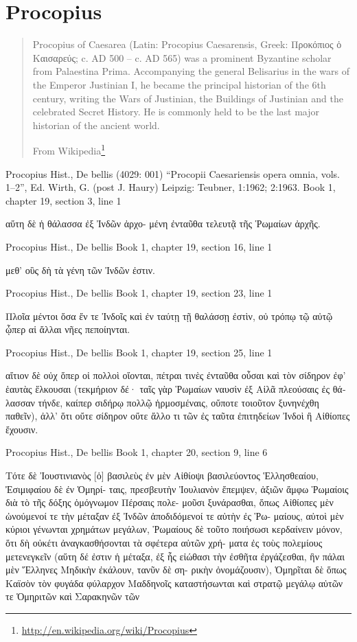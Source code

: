 \documentclass[12pt,letterpaper,twoside,final]{memoir}
\begin{document}
\section{Procopius}
\blockquote[From Wikipedia\footnote{\url{http://en.wikipedia.org/wiki/Procopius}}]{Procopius of Caesarea (Latin: Procopius Caesarensis, Greek: Προκόπιος ὁ Καισαρεύς; c. AD 500 – c. AD 565) was a prominent Byzantine scholar from Palaestina Prima. Accompanying the general Belisarius in the wars of the Emperor Justinian I, he became the principal historian of the 6th century, writing the Wars of Justinian, the Buildings of Justinian and the celebrated Secret History. He is commonly held to be the last major historian of the ancient world.}
\begin{greek}
Procopius Hist., De bellis (4029: 001)
“Procopii Caesariensis opera omnia, vols. 1–2”, Ed. Wirth, G. (post J. Haury)
Leipzig: Teubner, 1:1962; 2:1963.
Book 1, chapter 19, section 3, line 1

                   αὕτη δὲ ἡ θάλασσα ἐξ Ἰνδῶν ἀρχο-
μένη ἐνταῦθα τελευτᾷ τῆς Ῥωμαίων ἀρχῆς. 



Procopius Hist., De bellis 
Book 1, chapter 19, section 16, line 1

μεθ' οὓς δὴ τὰ γένη τῶν Ἰνδῶν ἐστιν. 



Procopius Hist., De bellis 
Book 1, chapter 19, section 23, line 1

Πλοῖα μέντοι ὅσα ἔν τε Ἰνδοῖς καὶ ἐν ταύτῃ τῇ 
θαλάσσῃ ἐστὶν, οὐ τρόπῳ τῷ αὐτῷ ᾧπερ αἱ ἄλλαι νῆες 
πεποίηνται. 



Procopius Hist., De bellis 
Book 1, chapter 19, section 25, line 1

αἴτιον δὲ οὐχ ὅπερ οἱ πολλοὶ οἴονται, πέτραι τινὲς 
ἐνταῦθα οὖσαι καὶ τὸν σίδηρον ἐφ' ἑαυτὰς ἕλκουσαι 
(τεκμήριον δέ· ταῖς γὰρ Ῥωμαίων ναυσὶν ἐξ Αἰλᾶ 
πλεούσαις ἐς θάλασσαν τήνδε, καίπερ σιδήρῳ πολλῷ 
ἡρμοσμέναις, οὔποτε τοιοῦτον ξυνηνέχθη παθεῖν), 
ἀλλ' ὅτι οὔτε σίδηρον οὔτε ἄλλο τι τῶν ἐς ταῦτα 
ἐπιτηδείων Ἰνδοὶ ἢ Αἰθίοπες ἔχουσιν. 



Procopius Hist., De bellis 
Book 1, chapter 20, section 9, line 6

Τότε δὲ Ἰουστινιανὸς [ὁ] βασιλεὺς ἐν μὲν Αἰθίοψι 
βασιλεύοντος Ἑλλησθεαίου, Ἐσιμιφαίου δὲ ἐν Ὁμηρί-
ταις, πρεσβευτὴν Ἰουλιανὸν ἔπεμψεν, ἀξιῶν ἄμφω 
Ῥωμαίοις διὰ τὸ τῆς δόξης ὁμόγνωμον Πέρσαις πολε-
μοῦσι ξυνάρασθαι, ὅπως Αἰθίοπες μὲν ὠνούμενοί τε   
τὴν μέταξαν ἐξ Ἰνδῶν ἀποδιδόμενοί τε αὐτὴν ἐς Ῥω-
μαίους, αὐτοὶ μὲν κύριοι γένωνται χρημάτων μεγάλων, 
Ῥωμαίους δὲ τοῦτο ποιήσωσι κερδαίνειν μόνον, ὅτι 
δὴ οὐκέτι ἀναγκασθήσονται τὰ σφέτερα αὐτῶν χρή-
ματα ἐς τοὺς πολεμίους μετενεγκεῖν (αὕτη δέ ἐστιν ἡ 
μέταξα, ἐξ ἧς εἰώθασι τὴν ἐσθῆτα ἐργάζεσθαι, ἣν 
πάλαι μὲν Ἕλληνες Μηδικὴν ἐκάλουν, τανῦν δὲ ση-
ρικὴν ὀνομάζουσιν), Ὁμηρῖται δὲ ὅπως Καϊσὸν τὸν 
φυγάδα φύλαρχον Μαδδηνοῖς καταστήσωνται καὶ στρατῷ 
μεγάλῳ αὐτῶν τε Ὁμηριτῶν καὶ Σαρακηνῶν τῶν


\end{greek}
\end{document}
